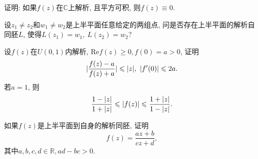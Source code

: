 \begin{yyEx}
    证明: 如果$f(z)$在$\mathbb{C}$上解析, 且平方可积, 则$f(z)\equiv 0$.
\end{yyEx}

\begin{yyEx}
    设$z_1\neq z_2$和$w_1\neq w_2$是上半平面任意给定的两组点, 问是否存在上半平面的解析自同胚$L$, 使得$L(z_1) = w_1,~L(z_2) = w_2$?
\end{yyEx}

\begin{yyEx}
    设$f(z)$在$U(0,1)$内解析, $\mathrm{Re}f(z)\geqslant 0,f(0) = a>0$, 证明
    \begin{equation*}
        \lvert\frac{f(z)-a}{f(z)+a}\rvert\leqslant \lvert z\rvert,~\lvert f'(0)\rvert\leqslant 2a.
    \end{equation*}
    若$a = 1$, 则\begin{equation*}
        \frac{1-\lvert z\rvert}{1+\lvert z\rvert}\leqslant \lvert f(z)\rvert \leqslant \frac{1+\lvert z\rvert}{1-\lvert z\rvert}.
    \end{equation*}
\end{yyEx}

\begin{yyEx}
    如果$f(z)$是上半平面到自身的解析同胚, 证明
    \begin{equation*}
        f(z) = \frac{az+b}{cz+d},
    \end{equation*}
    其中$a,b,c,d\in\mathbb{R},ad-bc>0$.
\end{yyEx}

\begin{yyEx}
    
\end{yyEx}
